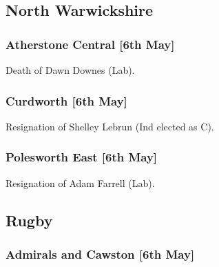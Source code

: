 \documentclass[a4paper,openany]{book}
\begin{document}
\begin{resultsiii}
\subsection*{North Warwickshire}

\subsubsection*{Atherstone Central \hspace*{\fill}\nolinebreak[1]%
	\enspace\hspace*{\fill}
	[6th May]}


Death of Dawn Downes (Lab).

\subsubsection*{Curdworth \hspace*{\fill}\nolinebreak[1]%
	\enspace\hspace*{\fill}
	[6th May]}


Resignation of Shelley Lebrun (Ind elected as C).

\subsubsection*{Polesworth East \hspace*{\fill}\nolinebreak[1]%
	\enspace\hspace*{\fill}
	[6th May]}


Resignation of Adam Farrell (Lab).

\subsection*{Rugby}

\subsubsection*{Admirals and Cawston \hspace*{\fill}\nolinebreak[1]%
	\enspace\hspace*{\fill}
	[6th May]}


\end{resultsiii}
\end{document}
